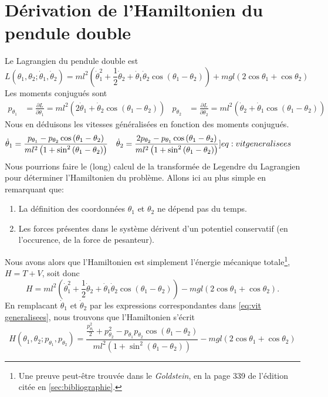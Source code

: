 \documentclass[11pt,oneside,a4paper]{article}
\newcommand{\dif}[2]{\frac{\partial #1}{\partial #2}}
\begin{document}
      \section{Dérivation de l'Hamiltonien du pendule double}\label{sec: derivation}
    Le Lagrangien du pendule double est 
    \begin{equation}
      L(\theta_1,\theta_2;\dot{\theta}_1,\dot{\theta}_2) = ml^2\left(\dot{\theta}_1^2+\frac{1}{2}\dot{\theta}_2+\dot{\theta}_1\dot{\theta}_2\cos\left(\theta_1-\theta_2\right)\right)+mgl\left(2\cos\theta_1+\cos\theta_2\right)
    \end{equation}
    Les moments conjugués sont
      \begin{align}
        p_{\theta_1} &= \dif{L}{\dot{\theta}_1} = ml^2\left(2\dot{\theta}_1+\dot{\theta}_2\cos\left(\theta_1-\theta_2\right)\right) & p_{\theta_2} &= \dif{L}{\dot{\theta}_2} = ml^2\left(\dot{\theta}_2+\dot{\theta}_1\cos\left(\theta_1-\theta_2\right)\right)
      \end{align}
      Nous en déduisons les vitesses généralisées en fonction des moments conjugués.
      \begin{align}
        \dot{\theta}_1 &= \frac{p_{\theta_1}-p_{\theta_2}\cos\left(\theta_1-\theta_2\right)}{ml^2\left(1+\sin^2\left(\theta_1-\theta_2\right)\right)} & \dot{\theta}_2 &= \frac{2p_{\theta_2}-p_{\theta_1}\cos\left(\theta_1-\theta_2\right)}{ml^2\left(1+\sin^2\left(\theta_1-\theta_2\right)\right)}\label[]{eq:vit generalisees}
      \end{align}
      Nous pourrions faire le (long) calcul de la transformée de Legendre du Lagrangien pour déterminer l'Hamiltonien du problème. Allons ici au plus simple en remarquant que:
      \begin{enumerate}
        \item La définition des coordonnées $\theta_1$ et $\theta_2$ ne dépend pas du temps.
        \item Les forces présentes dans le système dérivent d'un potentiel conservatif (en l'occurence, de la force de pesanteur).
      \end{enumerate}
      Nous avons alors que l'Hamiltonien est simplement l'énergie mécanique totale\footnote{Une preuve peut-être trouvée dans le \emph{Goldstein}, en la page 339 de l'édition citée en \ref{sec:bibliographie}.}, $H = T+V$, soit donc
      \begin{equation}
        H = ml^2\left(\dot{\theta}_1^2+\frac{1}{2}\dot{\theta}_2+\dot{\theta}_1\dot{\theta}_2\cos\left(\theta_1-\theta_2\right)\right)-mgl\left(2\cos\theta_1+\cos\theta_2\right).
      \end{equation}
      En remplacant $\dot{\theta}_1$ et $\dot{\theta}_2$ par les expressions correspondantes dans \eqref{eq:vit generalisees}, nous trouvons que l'Hamiltonien s'écrit
      \begin{equation}
        H(\theta_1,\theta_2;p_{\theta_1},p_{\theta_2}) = \frac{\frac{p_{\theta_1}^2}{2}+p_{\theta_2}^2-p_{\theta_1}p_{\theta_2}\cos\left(\theta_1-\theta_2\right)}{ml^2\left(1+\sin^2\left(\theta_1-\theta_2\right)\right)}-mgl\left(2\cos\theta_1+\cos\theta_2\right)
      \end{equation}
  \tableofcontents
\end{document}
